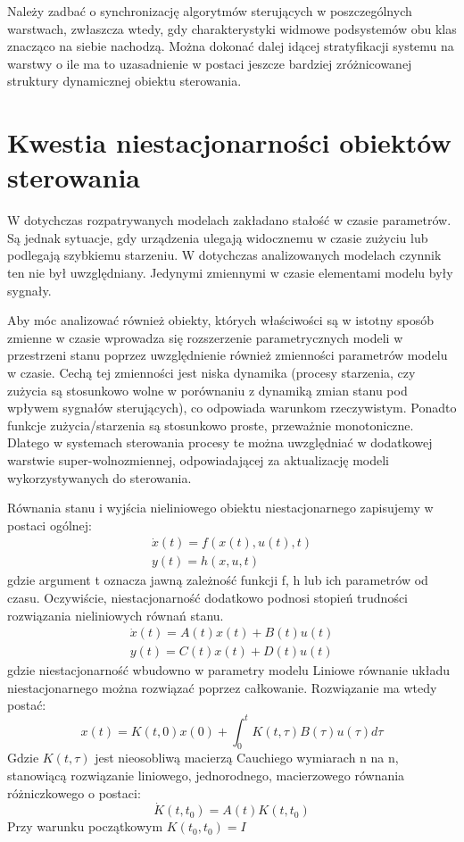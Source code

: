 \documentclass{article}
\begin{document}
		Należy zadbać o synchronizację algorytmów sterujących w poszczególnych warstwach,
		zwłaszcza wtedy, gdy charakterystyki widmowe podsystemów obu klas znacząco na
		siebie nachodzą. Można dokonać dalej idącej stratyfikacji systemu na warstwy 
		o ile ma to uzasadnienie w postaci jeszcze bardziej zróżnicowanej struktury
		dynamicznej obiektu sterowania.
	\section{Kwestia niestacjonarności obiektów sterowania}
		W dotychczas rozpatrywanych modelach zakładano stałość w czasie parametrów. Są
		jednak sytuacje, gdy urządzenia ulegają widocznemu w czasie zużyciu lub podlegają
		szybkiemu starzeniu. W dotychczas analizowanych modelach czynnik ten nie był
		uwzględniany. Jedynymi zmiennymi w czasie elementami modelu były sygnały.

		Aby móc analizować również obiekty, których właściwości są w istotny sposób zmienne
		w czasie wprowadza się rozszerzenie parametrycznych modeli w przestrzeni stanu
		poprzez uwzględnienie również zmienności parametrów modelu w czasie. Cechą tej
		zmienności jest niska dynamika (procesy starzenia, czy zużycia są stosunkowo wolne w
		porównaniu z dynamiką zmian stanu pod wpływem sygnałów sterujących), co
		odpowiada warunkom rzeczywistym. Ponadto funkcje zużycia/starzenia są stosunkowo
		proste, przeważnie monotoniczne. Dlatego w systemach sterowania procesy te można
		uwzględniać w dodatkowej warstwie super-wolnozmiennej, odpowiadającej za
		aktualizację modeli wykorzystywanych do sterowania.
		
		Równania stanu i wyjścia nieliniowego obiektu niestacjonarnego zapisujemy w postaci
		ogólnej:
		\begin{align*}
			\dot{x}(t) = f(x(t), u(t), t) \\
			y(t) = h(x,u,t)
		\end{align*}
		gdzie argument t oznacza jawną zależność funkcji f, h lub ich parametrów od czasu.
		Oczywiście, niestacjonarność dodatkowo podnosi stopień trudności rozwiązania
		nieliniowych równań stanu.
		\begin{align*}
			\dot{x}(t) = A(t) x(t) + B(t)u(t) \\
			y(t) = C(t) x(t) + D(t) u(t)
		\end{align*}
		gdzie niestacjonarność wbudowno w parametry modelu
		Liniowe równanie układu niestacjonarnego można rozwiązać poprzez całkowanie.
		Rozwiązanie ma wtedy postać:
		\begin{equation}
			x(t) = K(t, 0)x(0) + \int^t_0K(t,\tau)B(\tau)u(\tau)d\tau
		\end{equation}
		Gdzie $K(t,\tau)$ jest nieosobliwą macierzą Cauchiego wymiarach n na n, stanowiącą
		rozwiązanie liniowego, jednorodnego, macierzowego równania różniczkowego o postaci:
		\begin{equation}
			\dot{K}(t, t_0) = A(t)K(t,t_0)
		\end{equation}
		Przy warunku początkowym $K(t_0, t_0) = I$
\end{document}
